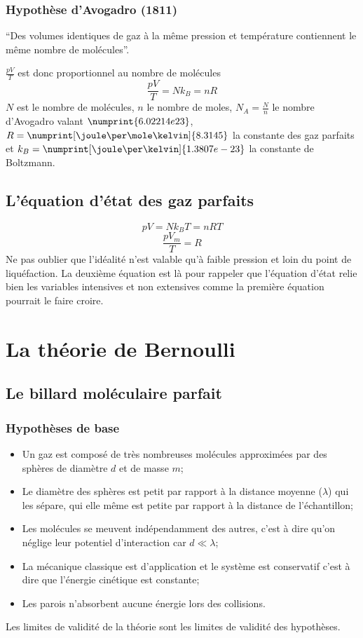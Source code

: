 \subsubsection{Hypothèse d'Avogadro (1811)}
``Des volumes identiques de gaz à la même pression et
température contiennent le même nombre de molécules''.

$\frac{pV}{T}$ est donc proportionnel au nombre de molécules
\[ \frac{pV}{T} = Nk_B = nR \]
$N$ est le nombre de molécules,
$n$ le nombre de moles,
$N_A = \frac{N}{n}$ le nombre d'Avogadro valant $\numprint{6.02214e23}$,
$R = \numprint[\joule\per\mole\kelvin]{8.3145}$ la constante des gaz parfaits et
$k_B = \numprint[\joule\per\kelvin]{1.3807e-23}$ la constante de Boltzmann.

\subsection{L'équation d'état des gaz parfaits}
\[ pV = Nk_BT = nRT \]
\[ \frac{pV_m}{T} = R \]
Ne pas oublier que l'idéalité n'est valable qu'à faible pression et
loin du point de liquéfaction.
La deuxième équation est là pour rappeler que l'équation d'état relie bien
les variables intensives et non extensives comme la première équation pourrait
le faire croire.

\section{La théorie de Bernoulli}
\subsection{Le billard moléculaire parfait}
\subsubsection{Hypothèses de base}
\begin{itemize}
  \item Un gaz est composé de très nombreuses molécules approximées
    par des sphères de diamètre $d$ et de masse $m$;
  \item Le diamètre des sphères est petit par rapport
    à la distance moyenne ($\lambda$) qui les sépare, qui elle même est petite
    par rapport à la distance de l'échantillon;
  \item Les molécules se meuvent indépendamment des autres,
    c'est à dire qu'on néglige leur potentiel d'interaction car $d \ll \lambda$;
  \item La mécanique classique est d'application et le système est conservatif
    c'est à dire que l'énergie cinétique est constante;
  \item Les parois n'absorbent aucune énergie lors des collisions.
\end{itemize}
Les limites de validité de la théorie sont
les limites de validité des hypothèses.

